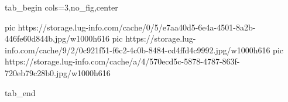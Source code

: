  
 
 
 
 


\ifcmt
  tab_begin cols=3,no_fig,center

     pic https://storage.lug-info.com/cache/0/5/e7aa40d5-6e4a-4501-8a2b-446fe60d844b.jpg/w1000h616
		 pic https://storage.lug-info.com/cache/9/2/0c921f51-f6c2-4c0b-8484-cd4ffd4c9992.jpg/w1000h616
		 pic https://storage.lug-info.com/cache/a/4/570ecd5c-5878-4787-863f-720eb79c28b0.jpg/w1000h616

  tab_end
\fi
